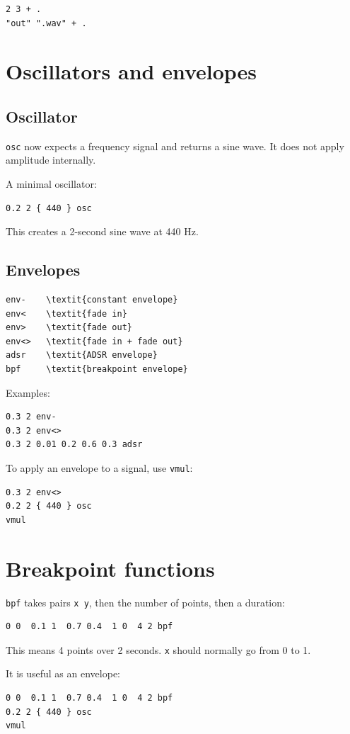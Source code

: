 \documentclass[11pt]{article}
\begin{document}
\begin{lstlisting}
2 3 + .
"out" ".wav" + .
\end{lstlisting}

\section*{Oscillators and envelopes}
\subsection*{Oscillator}
\texttt{osc} now expects a frequency signal and returns a sine wave. It does not apply amplitude internally.

A minimal oscillator:
\begin{lstlisting}
0.2 2 { 440 } osc
\end{lstlisting}

This creates a 2-second sine wave at 440 Hz.

\subsection*{Envelopes}
\begin{lstlisting}
env-    \textit{constant envelope}
env<    \textit{fade in}
env>    \textit{fade out}
env<>   \textit{fade in + fade out}
adsr    \textit{ADSR envelope}
bpf     \textit{breakpoint envelope}
\end{lstlisting}

Examples:
\begin{lstlisting}
0.3 2 env-
0.3 2 env<>
0.3 2 0.01 0.2 0.6 0.3 adsr
\end{lstlisting}

To apply an envelope to a signal, use \texttt{vmul}:
\begin{lstlisting}
0.3 2 env<>
0.2 2 { 440 } osc
vmul
\end{lstlisting}

\section*{Breakpoint functions}
\texttt{bpf} takes pairs \texttt{x y}, then the number of points, then a duration:
\begin{lstlisting}
0 0  0.1 1  0.7 0.4  1 0  4 2 bpf
\end{lstlisting}
This means 4 points over 2 seconds. \texttt{x} should normally go from 0 to 1.

It is useful as an envelope:
\begin{lstlisting}
0 0  0.1 1  0.7 0.4  1 0  4 2 bpf
0.2 2 { 440 } osc
vmul
\end{lstlisting}
\end{document}
